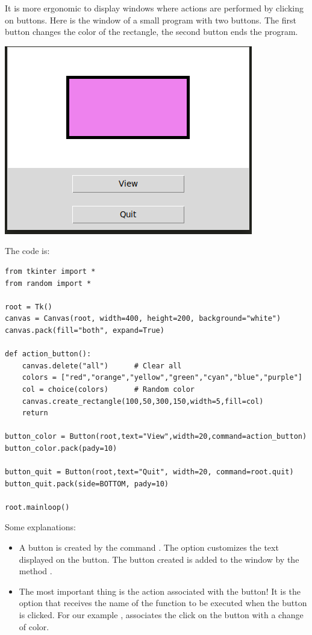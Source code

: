 \documentclass[11pt,class=report,crop=false]{standalone}
\begin{document}
\begin{cours}


It is more ergonomic to display windows where actions are performed by clicking on buttons.
Here is the window of a small program with two buttons. The first button changes the color of the rectangle, the second button ends the program.
\begin{center}
\includegraphics[scale=\myscale,scale=0.6]{screen-stat-lesson-buttons-en}
\end{center}

The code is:
\begin{lstlisting}
from tkinter import *
from random import *

root = Tk()     
canvas = Canvas(root, width=400, height=200, background="white")
canvas.pack(fill="both", expand=True)

def action_button():
    canvas.delete("all")      # Clear all
    colors = ["red","orange","yellow","green","cyan","blue","purple"]
    col = choice(colors)      # Random color
    canvas.create_rectangle(100,50,300,150,width=5,fill=col)
    return

button_color = Button(root,text="View",width=20,command=action_button)
button_color.pack(pady=10)

button_quit = Button(root,text="Quit", width=20, command=root.quit)
button_quit.pack(side=BOTTOM, pady=10)

root.mainloop()
\end{lstlisting}

Some explanations:
\begin{itemize}
  \item A button is created by the command . The  option customizes the text displayed on the button. The button created is added to the window by the method .
  \item The most important thing is the action associated with the button! It is the option  that receives the name of the function to be executed when the button is clicked. For our example , associates the click on the button with a change of color.
  

\end{itemize}
\end{cours}
\end{document}
